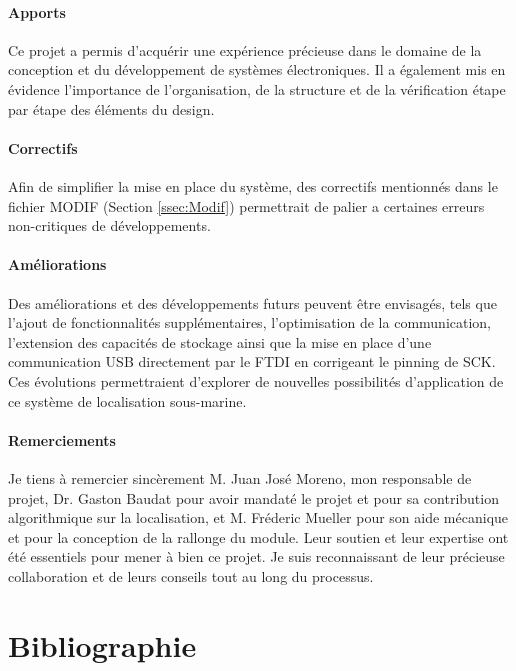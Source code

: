 \documentclass[12pt,a4paper,twoside]{article}
\begin{document}
{	\paragraph{Apports} Ce projet a permis d'acquérir une expérience précieuse dans le domaine de la conception et du développement de systèmes électroniques. Il a également mis en évidence l'importance de l'organisation, de la structure et de la vérification étape par étape des éléments du design.
	
	\paragraph{Correctifs} Afin de simplifier la mise en place du système, des correctifs mentionnés dans le fichier MODIF (Section \ref{ssec:Modif}) permettrait de palier a certaines erreurs non-critiques de développements.
	
	\paragraph{Améliorations} Des améliorations et des développements futurs peuvent être envisagés, tels que l'ajout de fonctionnalités supplémentaires, l'optimisation de la communication, l'extension des capacités de stockage ainsi que la mise en place d'une communication USB directement par le FTDI en corrigeant le pinning de SCK. Ces évolutions permettraient d'explorer de nouvelles possibilités d'application de ce système de localisation sous-marine.
	
	\paragraph{Remerciements} Je tiens à remercier sincèrement M. Juan José Moreno, mon responsable de projet, Dr. Gaston Baudat pour avoir mandaté le projet et pour sa contribution algorithmique sur la localisation, et M. Fréderic Mueller pour son aide mécanique et pour la conception de la rallonge du module. Leur soutien et leur expertise ont été essentiels pour mener à bien ce projet. Je suis reconnaissant de leur précieuse collaboration et de leurs conseils tout au long du processus.
	
	
}


\newpage
\nocite{*}
\section{Bibliographie}
 

\end{document}
